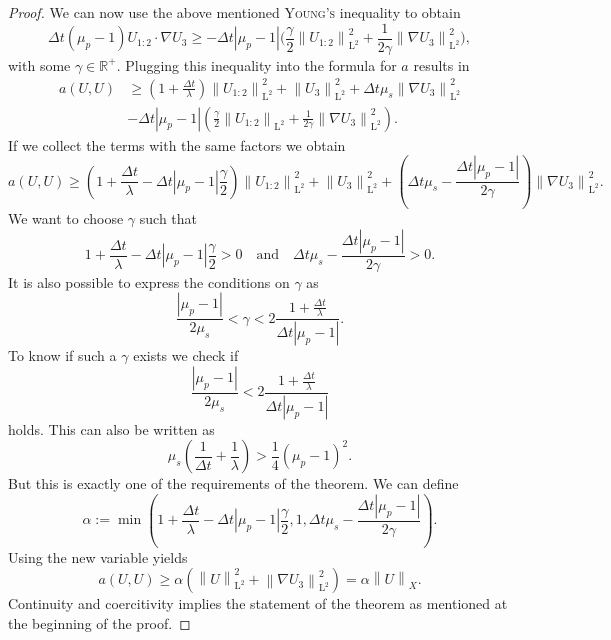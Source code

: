 \documentclass[12pt,a4paper,twoside, open=right]{scrreprt}
\theoremstyle{definition}
\theoremstyle{plain}
\newcommand{\abs}[1]{\left\vert #1\right\vert}
\newcommand{\rr}{\mathbb{R}}
\newcommand{\norm}[1]{\left\lVert#1\right\rVert}
\newcommand{\ltnorm}[1]{\norm{#1}_{\mathrm{L}^2}}
\begin{document}
\begin{proof}
    We can now use the above mentioned \textsc{Young's} inequality to obtain
    \begin{equation}
        \Delta t(\mu_p-1)U_{1:2}\cdot \nabla U_3\ge -\Delta t\abs{\mu_p-1}\big(\frac{\gamma}{2}\ltnorm{U_{1:2}}^2+\frac{1}{2\gamma}\ltnorm{\nabla U_3}^2\big),
    \end{equation}with some $\gamma\in\rr^+$. Plugging this inequality into the formula for $a$ results in
    \begin{align}
        a(U,U)&\ge \left(1+\frac{\Delta t}{\lambda}\right)\ltnorm{U_{1:2}}^2+\ltnorm{U_3}^2+\Delta t\mu_s\ltnorm{\nabla U_3}^2\\&-\Delta t\abs{\mu_p-1}\left(\frac{\gamma}{2}\ltnorm{U_{1:2}}+\frac{1}{2\gamma}\ltnorm{\nabla U_3}^2\right).
    \end{align}
    If we collect the terms with the same factors we obtain
    \begin{equation}
        a(U,U)\ge \left(1+\frac{\Delta t}{\lambda}-\Delta t\abs{\mu_p-1}\frac{\gamma}{2}\right)\ltnorm{U_{1:2}}^2+\ltnorm{U_3}^2+\left(\Delta t\mu_s-\frac{\Delta t\abs{\mu_p -1}}{2\gamma}\right)\ltnorm{\nabla U_3}^2.
    \end{equation}
    We want to choose $\gamma$ such that 
    \begin{equation}
        1+\frac{\Delta t}{\lambda}-\Delta t\abs{\mu_p-1}\frac{\gamma}{2}>0 \quad\text{and}\quad\Delta t\mu_s-\frac{\Delta t\abs{\mu_p -1}}{2\gamma}>0.
    \end{equation}
    It is also possible to express the conditions on $\gamma$ as
    \begin{equation}
        \frac{\abs{\mu_p-1} }{2\mu_s}<\gamma<2\frac{1+\frac{\Delta t}{\lambda}}{\Delta t\abs{\mu_p -1}}.
    \end{equation}
    To know if such a $\gamma$ exists we check if
    \begin{equation}
       \frac{\abs{\mu_p-1} }{2\mu_s}<2\frac{1+\frac{\Delta t}{\lambda}}{\Delta t\abs{\mu_p -1}}
    \end{equation}
    holds. This can also be written as
    \begin{equation}
        \mu_s\left(\frac{1}{\Delta t}+\frac{1}{\lambda}\right)>\frac{1}{4}(\mu_p-1)^2.
    \end{equation}
    But this is exactly one of the requirements of the theorem. We can define 
    \begin{equation}
        \alpha:=\min(1+\frac{\Delta t}{\lambda}-\Delta t\abs{\mu_p-1}\frac{\gamma}{2},1,\Delta t\mu_s-\frac{\Delta t\abs{\mu_p -1}}{2\gamma}).
    \end{equation}
    Using the new variable yields
    \begin{equation}
        a(U,U)\ge \alpha(\ltnorm{U}^2+\ltnorm{\nabla U_3}^2)=\alpha\norm{U}_X.
    \end{equation}
    Continuity and coercitivity implies the statement of the theorem as mentioned at the beginning of the proof.
\end{proof}
\end{document}
